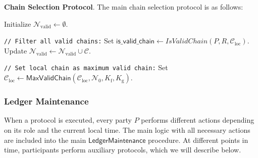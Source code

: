 \bigbreak
\bigbreak
\noindent
\textbf{Chain Selection Protocol}.
The main chain selection protocol is as follows:
\begin{protocol}
    \caption{$\textsf{SelectChain}(P, R, K_{\text{f}}, K_{\text{g}}, \mathcal{C}_{\text{loc}}, \mathcal{N}_0)$}
    \begin{algorithmic}[1]
        \State Initialize $\mathcal{N}_{\text{valid}} \leftarrow \emptyset$.

        \noindent
        \lstinline|// Filter all valid chains:|
            \State Set $\textsf{is\_valid\_chain} \leftarrow IsValidChain(P, R, \mathcal{C}_{\text{loc}})$.
                \State Update $\mathcal{N}_{\text{valid}} \leftarrow \mathcal{N}_{\text{valid}} \cup \mathcal{C}$.
            \EndIf
        \EndFor

        \noindent
        \lstinline|// Set local chain as maximum valid chain:|
        \State Set $\mathcal{C}_{\text{loc}} \leftarrow \textsf{MaxValidChain}(\mathcal{C}_{\text{loc}}, \mathcal{N}_0, K_{\text{f}}, K_{\text{g}})$.

    \end{algorithmic}\label{alg:algorithm-89}
\end{protocol}

\subsubsection{Ledger Maintenance}
When a protocol is executed, every party $P$ performs different actions depending on its role and the current local time.
The main logic with all necessary actions are included into the main $\textsf{LedgerMaintenance}$ procedure.
At different points in time, participants perform auxiliary protocols, which we will describe below.

